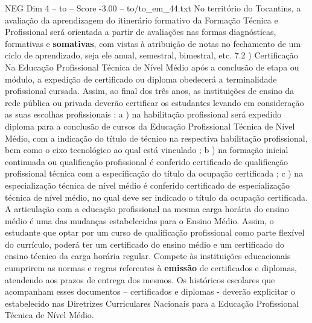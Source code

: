 \begin{textsample}{NEG Dim 4 – to – Score -3.00 – to/to\_em\_44.txt}
No território do Tocantins, a avaliação da aprendizagem do itinerário formativo da Formação Técnica e Profissional será orientada a partir de avaliações nas formas diagnósticas, formativas e \textbf{somativas}, com vistas à atribuição de notas no fechamento de um ciclo de aprendizado, seja ele anual, semestral, bimestral, etc. 7.2 ) Certificação Na Educação Profissional Técnica de Nível Médio após a conclusão de etapa ou módulo, a expedição de certificado ou diploma obedecerá a terminalidade profissional cursada.
Assim, ao final dos três anos, as instituições de ensino da rede pública ou privada deverão certificar os estudantes levando em consideração as suas escolhas profissionais : a ) na habilitação profissional será expedido diploma para a conclusão de cursos da Educação Profissional Técnica de Nível Médio, com a indicação do título de técnico na respectiva habilitação profissional, bem como o eixo tecnológico ao qual está vinculado ; b ) na formação inicial continuada ou qualificação profissional é conferido certificado de qualificação profissional técnica com a especificação do título da ocupação certificada ; c ) na especialização técnica de nível médio é conferido certificado de especialização técnica de nível médio, no qual deve ser indicado o título da ocupação certificada.
A articulação com a educação profissional na mesma carga horária do ensino médio é uma das mudanças estabelecidas para o Ensino Médio.
Assim, o estudante que optar por um curso de qualificação profissional como parte flexível do currículo, poderá ter um certificado do ensino médio e um certificado do ensino técnico da carga horária regular.
Compete às instituições educacionais cumprirem as normas e regras referentes à \textbf{emissão} de certificados e diplomas, atendendo aos prazos de entrega dos mesmos.
Os históricos escolares que acompanham esses documentos – certificados e diplomas - deverão explicitar o estabelecido nas Diretrizes Curriculares Nacionais para a Educação Profissional Técnica de Nível Médio.

\end{textsample}
